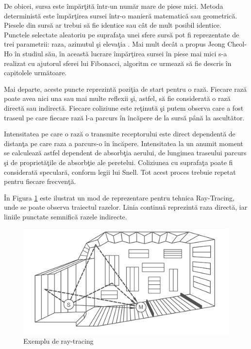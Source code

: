 	
	De obicei, sursa este \^{i}mp\u{a}r\c{t}it\u{a} \^{i}ntr-un num\u{a}r mare de piese mici. Metoda determinist\u{a} este \^{i}mp\u{a}r\c{t}irea sursei \^{i}ntr-o manier\u{a} matematic\u{a} sau geometric\u{a}. Piesele din surs\u{a} ar trebui s\u{a} fie identice sau c\^{a}t de mult posibil identice. Punctele selectate aleatoriu pe suprafa\c{t}a unei sfere surs\u{a} pot fi reprezentate de trei parametrii: raza, azimutul \c{s}i eleva\c{t}ia \cite{jeong}. Mai mult dec\^{a}t a propus Jeong Cheol-Ho \^{i}n studiul s\u{a}u, \^{i}n aceast\u{a} lucrare \^{i}mp\u{a}r\c{t}irea sursei \^{i}n piese mai mici s-a realizat cu ajutorul sferei lui Fibonacci, algoritm ce urmeaz\u{a} s\u{a} fie descris \^{i}n capitolele urm\u{a}toare.
	 
	
	Mai departe, aceste puncte reprezint\u{a} pozi\c{t}ia de start pentru o raz\u{a}. Fiecare raz\u{a} poate avea nici una sau mai multe reflexii \c{s}i, astfel, s\u{a} fie considerat\u{a} o raz\u{a} direct\u{a} sau indirect\u{a}. Fiecare coliziune este re\c{t}inut\u{a} \c{s}i putem observa care a fost traseul pe care fiecare raz\u{a} l-a parcurs \^{i}n \^{i}nc\u{a}pere de la surs\u{a} p\^{a}n\u{a} la ascult\u{a}tor.
	 
	
	Intensitatea pe care o raz\u{a} o transmite receptorului este direct dependent\u{a} de distan\c{t}a pe care raza a parcurs-o \^{i}n \^{i}nc\u{a}pere. Intensitatea la un anumit moment se calculeaz\u{a} astfel dependent de absorb\c{t}ia aerului, de lungimea traseului parcurs \c{s}i de propriet\u{a}\c{t}ile de absorb\c{t}ie ale peretelui. Coliziunea cu suprafa\c{t}a poate fi considerat\u{a} specular\u{a}, conform legii lui Snell.	Tot acest proces trebuie repetat pentru fiecare frecven\c{t}\u{a}.
	 
	
	\^{I}n Figura \ref{Fig9} este ilustrat un mod de reprezentare pentru tehnica Ray-Tracing, unde se poate observa traiectul razelor. Linia continu\u{a} reprezint\u{a} raza direct\u{a}, iar liniile punctate semnific\u{a} razele indirecte.
	
	\begin{figure}[!htb]
		\centering
		\includegraphics[width=1\linewidth]{imagini/roomExample.png}
		\caption{Exemplu de ray-tracing}
		\label{Fig9}
	\end{figure}
	
